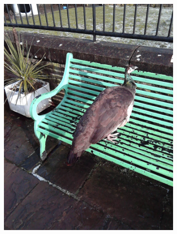 \documentclass{l4proj}
\begin{document}
\begin{figure}[ht]
\begin{subfigure}[h!]{0.18\textwidth}
    \includegraphics[width=\textwidth, trim={0cm 6cm 0cm 6cm}, clip]{images/dataset/peacock/rgb.png}

\end{subfigure}
\end{figure}
\end{document}
